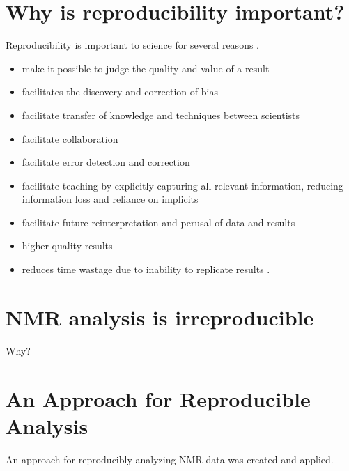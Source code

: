 \section{Why is reproducibility important?}
Reproducibility is important to science for several reasons \cite{borgman2012conundrum}.
\begin{itemize}
  \item make it possible to judge the quality and value of a result
  \item facilitates the discovery and correction of bias
  \item facilitate transfer of knowledge and techniques between scientists \cite{rung2013reuse}
  \item facilitate collaboration
  \item facilitate error detection and correction
  \item facilitate teaching by explicitly capturing all relevant information,
        reducing information loss and reliance on implicits
  \item facilitate future reinterpretation and perusal of data and results
  \item higher quality results
  \item reduces time wastage due to inability to replicate results 
        \cite{ioannidis2005most, mullard2011reliability, prinz2011reproducibility, begley2012drug}. 
\end{itemize}


\section{NMR analysis is irreproducible}
Why?


\section{An Approach for Reproducible Analysis}
An approach for reproducibly analyzing NMR data was created and applied.

